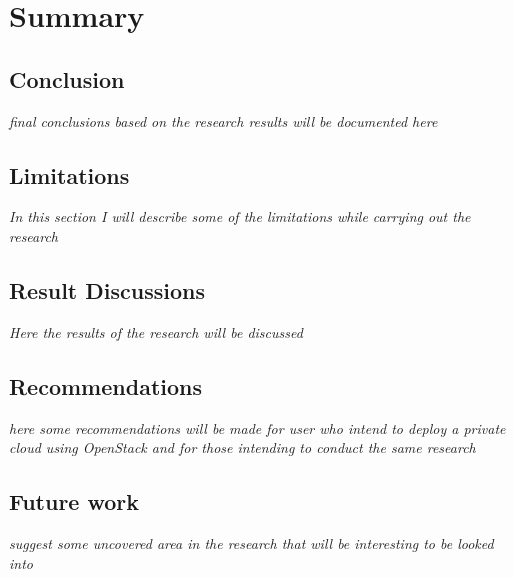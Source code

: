 \chapter{Summary}\label{chapter:summary}
\section{Conclusion}
\textit{final conclusions based on the research results will be documented here}
\section{Limitations}
\textit{In this section I will describe some of the limitations while carrying out the research}
\section{Result Discussions}
\textit{Here the results of the research will be discussed}
\section{Recommendations}
\textit{here some recommendations will be made for user who intend to deploy a private cloud using OpenStack and for those intending to conduct the same research}
\section{Future work}
\textit{suggest some uncovered area in the research that will be interesting to be looked into}
